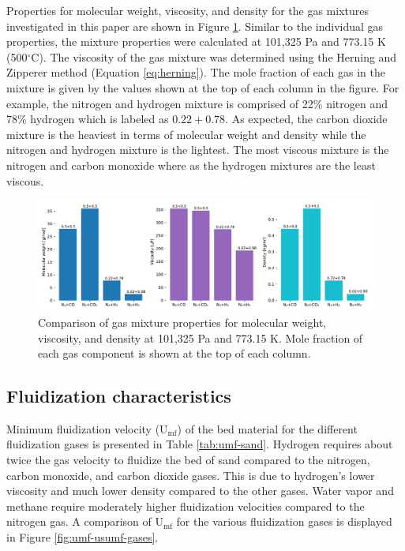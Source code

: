 \documentclass{article}
\begin{document}
Properties for molecular weight, viscosity, and density for the gas mixtures investigated in this paper are shown in Figure \ref{fig:mix-properties}. Similar to the individual gas properties, the mixture properties were calculated at 101,325 Pa and 773.15 K (500$^\circ$C). The viscosity of the gas mixture was determined using the Herning and Zipperer method (Equation \ref{eq:herning}). The mole fraction of each gas in the mixture is given by the values shown at the top of each column in the figure. For example, the nitrogen and hydrogen mixture is comprised of 22\% nitrogen and 78\% hydrogen which is labeled as $0.22 + 0.78$. As expected, the carbon dioxide mixture is the heaviest in terms of molecular weight and density while the nitrogen and hydrogen mixture is the lightest. The most viscous mixture is the nitrogen and carbon monoxide where as the hydrogen mixtures are the least viscous.

\begin{figure}[H]
    \centering
    \includegraphics[width=\textwidth]{mix-properties.pdf}
    \caption{Comparison of gas mixture properties for molecular weight, viscosity, and density at 101,325 Pa and 773.15 K. Mole fraction of each gas component is shown at the top of each column.}
    \label{fig:mix-properties}
\end{figure}

\subsection{Fluidization characteristics}\label{sec:fluidization-charact}

Minimum fluidization velocity (U$_\text{mf}$) of the bed material for the different fluidization gases is presented in Table \ref{tab:umf-sand}. Hydrogen requires about twice the gas velocity to fluidize the bed of sand compared to the nitrogen, carbon monoxide, and carbon dioxide gases. This is due to hydrogen's lower viscosity and much lower density compared to the other gases. Water vapor and methane require moderately higher fluidization velocities compared to the nitrogen gas. A comparison of U$_\text{mf}$ for the various fluidization gases is displayed in Figure \ref{fig:umf-usumf-gases}.
\end{document}

